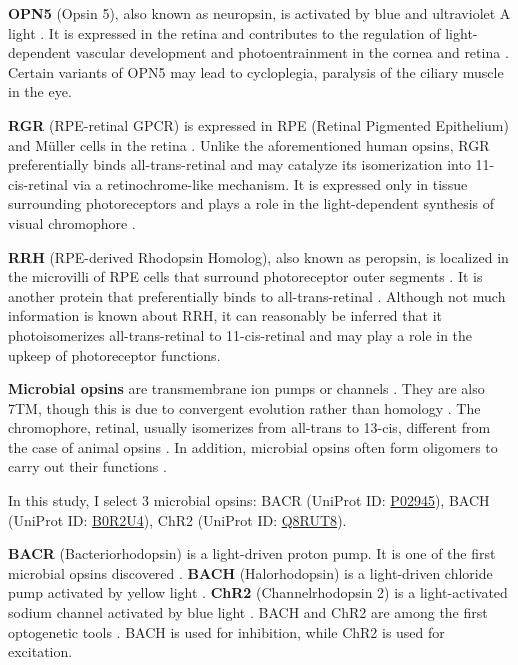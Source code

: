\documentclass[fleqn, 10pt]{manuscript}
\begin{document}
\textbf{OPN5} (Opsin 5), also known as neuropsin, is activated by blue and ultraviolet A light \citep{Tarttelin_2003}. It is expressed in the retina and contributes to the regulation of light-dependent vascular development and photoentrainment in the cornea and retina \citep{Buhr_2015}. Certain variants of OPN5 may lead to cycloplegia, paralysis of the ciliary muscle in the eye. 

\textbf{RGR} (RPE-retinal GPCR) is expressed in RPE (Retinal Pigmented Epithelium) and M\"uller cells in the retina \citep{Shen_1994}. Unlike the aforementioned human opsins, RGR preferentially binds all-trans-retinal and may catalyze its isomerization into 11-cis-retinal via a retinochrome-like mechanism. It is expressed only in tissue surrounding photoreceptors and plays a role in the light-dependent synthesis of visual chromophore \citep{Radu_2008}.

\textbf{RRH} (RPE-derived Rhodopsin Homolog), also known as peropsin, is localized in the microvilli of RPE cells that surround photoreceptor outer segments \citep{Sun_1997}. It is another protein that preferentially binds to all-trans-retinal \citep{Cook_2017}. Although not much information is known about RRH, it can reasonably be inferred that it photoisomerizes all-trans-retinal to 11-cis-retinal and may play a role in the upkeep of photoreceptor functions. 

\textbf{Microbial opsins} are transmembrane ion pumps or channels \citep{Findlay_1986}. They are also 7TM, though this is due to convergent evolution rather than homology \citep{Yee_2013}. The chromophore, retinal, usually isomerizes from all-trans to 13-cis, different from the case of animal opsins \citep{Findlay_1986}. In addition, microbial opsins often form oligomers to carry out their functions \citep{Gmelin_2007}.

In this study, I select 3 microbial opsins: BACR (UniProt ID: \href{https://www.uniprot.org/uniprotkb/P02945/entry}{P02945}), BACH (UniProt ID: \href{https://www.uniprot.org/uniprotkb/B0R2U4/entry}{B0R2U4}), ChR2 (UniProt ID: \href{https://www.uniprot.org/uniprotkb/Q8RUT8/entry}{Q8RUT8}). 

\textbf{BACR} (Bacteriorhodopsin) is a light-driven proton pump. It is one of the first microbial opsins discovered \citep{Oesterhelt_1971}. \textbf{BACH} (Halorhodopsin) is a light-driven chloride pump activated by yellow light \citep{Schobert_1982}. \textbf{ChR2} (Channelrhodopsin 2) is a light-activated sodium channel activated by blue light \citep{Nagel_2003}. BACH and ChR2 are among the first optogenetic tools \citep{Zhang_2007, Han_2007}. BACH is used for inhibition, while ChR2 is used for excitation. 
\end{document}
